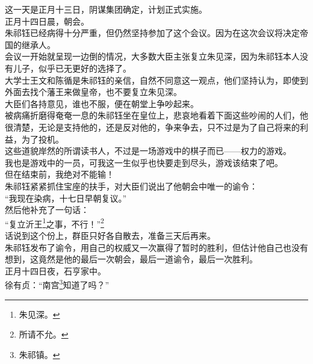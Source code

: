 \begin{multicols}{\theparacolNo}
这一天是正月十三日，阴谋集团确定，计划正式实施。\\

正月十四日晨，朝会。\\

朱祁钰已经病得十分严重，但仍然坚持参加了这个会议。因为在这次会议将决定帝国的继承人。\\

会议一开始就呈现一边倒的情况，大多数大臣主张复立朱见深，因为朱祁钰本人没有儿子，似乎已无更好的选择了。\\

大学士王文和陈循是朱祁钰的亲信，自然不同意这一观点，他们坚持认为，即使到外面去找个藩王来做皇帝，也不要复立朱见深。\\

大臣们各持意见，谁也不服，便在朝堂上争吵起来。\\

被病痛折磨得奄奄一息的朱祁钰坐在皇位上，悲哀地看着下面这些吵闹的人们，他很清楚，无论是支持他的，还是反对他的，争来争去，只不过是为了自己将来的利益，为了投机。\\

这些道貌岸然的所谓读书人，不过是一场游戏中的棋子而已——权力的游戏。\\

我也是游戏中的一员，可我这一生似乎也快要走到尽头，游戏该结束了吧。\\

但在结束前，我绝对不能输！\\

朱祁钰紧紧抓住宝座的扶手，对大臣们说出了他朝会中唯一的谕令：\\

“我现在染病，十七日早朝复议。”\\

然后他补充了一句话：\\

“复立沂王\footnote{朱见深。}之事，不行！”\footnote{所请不允。}\\

话说到这个份上，群臣只好各自散去，准备三天后再来。\\

朱祁钰发布了谕令，用自己的权威又一次赢得了暂时的胜利，但估计他自己也没有想到，这竟然是他的最后一次朝会，最后一道谕令，最后一次胜利。\\

正月十四日夜，石亨家中。\\

徐有贞：“南宫\footnote{朱祁镇。}知道了吗？”\\


\end{multicols}
